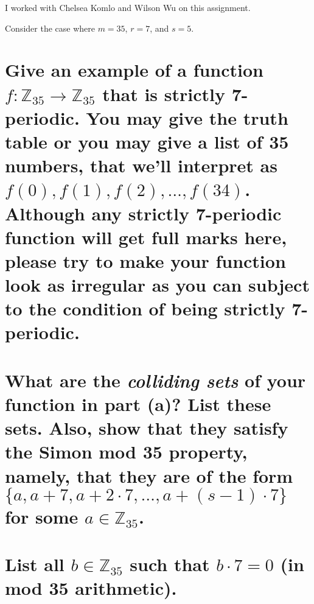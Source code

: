 \documentclass[boxes,pages]{homework}
\begin{document}
\noindent
I worked with Chelsea Komlo and Wilson Wu on this assignment.

\begin{problem}
Consider the case where $m = 35$, $r = 7$, and $s = 5$.
\begin{parts}
	\part{Give an example of a function $f: \mathbb{Z}_{35}\to \mathbb{Z}_{35}$ that is strictly 7-periodic. You may give the truth table or you may give a list of 35 numbers, that we'll interpret as $f(0),f(1),f(2),\ldots,f(34)$. Although any strictly 7-periodic function will get full marks here, please try to make your function look as irregular as you can subject to the condition of being strictly 7-periodic.}\label{part:1a}
	\part{What are the \emph{colliding sets} of your function in part (a)? List these sets. Also, show that they satisfy the Simon mod 35 property, namely, that they are of the form $\{a, a+7, a+2\cdot 7, \ldots, a+(s-1)\cdot 7\}$ for some $a\in\mathbb{Z}_{35}$.}\label{part:1b}
	\part{List all $b\in\mathbb{Z}_{35}$ such that $b\cdot 7 = 0$ (in mod 35 arithmetic).}\label{part:1c}
\end{parts}
\end{problem}
\end{document}

